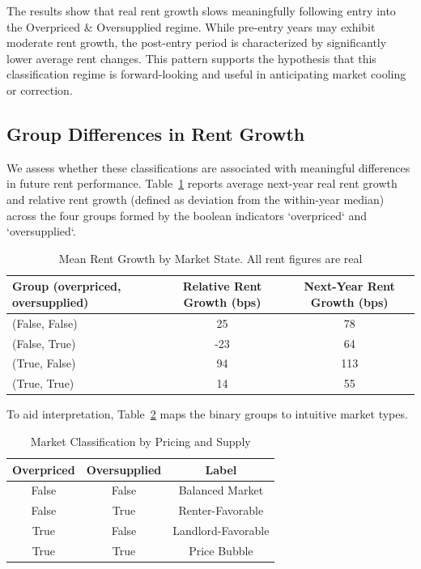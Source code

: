 \documentclass[sn-mathphys-num]{sn-jnl}%
\begin{document}
The results show that real rent growth slows meaningfully following entry into the Overpriced \& Oversupplied regime. While pre-entry years may exhibit moderate rent growth, the post-entry period is characterized by significantly lower average rent changes. This pattern supports the hypothesis that this classification regime is forward-looking and useful in anticipating market cooling or correction.

\subsection*{Group Differences in Rent Growth}

We assess whether these classifications are associated with meaningful differences in future rent performance. Table~\ref{tab:simplifiedmeans} reports average next-year real rent growth and relative rent growth (defined as deviation from the within-year median) across the four groups formed by the boolean indicators `overpriced` and `oversupplied`.

\begin{table}[h!]
	\centering
	\caption*{Mean Rent Growth by Market State. All rent figures are real}
	\label{tab:simplifiedmeans}
	\begin{tabular}{lcc}
		\toprule
		\textbf{Group (overpriced, oversupplied)} & \textbf{Relative Rent Growth (bps)} & \textbf{Next-Year Rent Growth (bps)} \\
		\midrule
		(False, False) & 25 & 78 \\
		(False, True)  & -23 & 64 \\
		(True, False)  & 94 & 113 \\
		(True, True)   & 14 & 55 \\
		\bottomrule
	\end{tabular}
\end{table}

To aid interpretation, Table~\ref{tab:matrixlabels} maps the binary groups to intuitive market types.

\begin{table}[h!]
	\centering
	\caption*{Market Classification by Pricing and Supply}
	\label{tab:matrixlabels}
	\begin{tabular}{cc|c}
		\toprule
		\textbf{Overpriced} & \textbf{Oversupplied} & \textbf{Label} \\
		\midrule
		False & False & Balanced Market \\
		False & True & Renter-Favorable \\
		True  & False & Landlord-Favorable \\
		True  & True  & Price Bubble \\
		\bottomrule
	\end{tabular}
\end{table}
\end{document}
